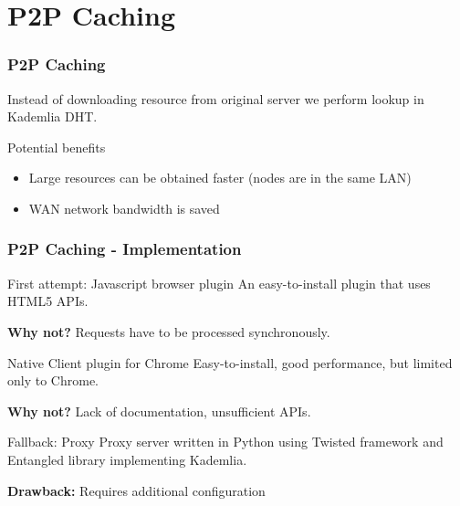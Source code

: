 \documentclass{beamer}
\begin{document}
\section{P2P Caching}
\begin{frame}
\frametitle{P2P Caching}

\begin{block}{}
Instead of downloading resource from original server we perform lookup
in Kademlia DHT.
\end{block}

\begin{block}{Potential benefits}
\begin{itemize}
  \item Large resources can be obtained faster (nodes are in the same LAN)
  \item WAN network bandwidth is saved
\end{itemize}
\end{block}

\end{frame}

\begin{frame}
\frametitle{P2P Caching - Implementation}

\begin{block}{First attempt: Javascript browser plugin}
An easy-to-install plugin that uses HTML5 APIs.

\textbf{Why not?} Requests have to be processed synchronously. 
\end{block}

\pause
\begin{block}{Native Client plugin for Chrome}
Easy-to-install, good performance, but limited only to Chrome.

\textbf{Why not?} Lack of documentation, unsufficient APIs.
\end{block}

\pause
\begin{block}{Fallback: Proxy \cite{guha2002improving}}
Proxy server written in Python using Twisted framework and Entangled library implementing Kademlia.

\textbf{Drawback:} Requires additional configuration
\end{block}

\end{frame}
\end{document}
